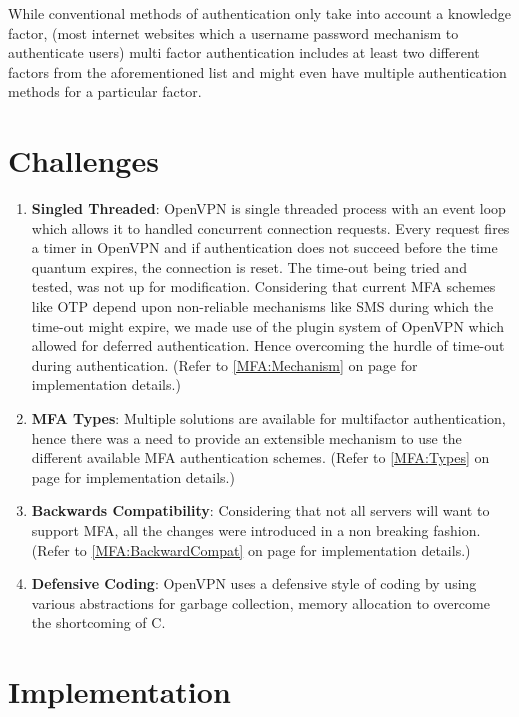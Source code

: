 \documentclass[11pt,oneside]{book}
\begin{document}
While conventional methods of authentication only take into account a knowledge factor,
(most internet websites which a username password mechanism to authenticate users)
multi factor authentication includes at least two different factors from the aforementioned
list and might even have multiple authentication methods for a particular factor.

\section{Challenges}
\begin{enumerate}
    \item \textbf{Singled Threaded}: OpenVPN is single threaded process with an event loop which
        allows it to handled concurrent connection requests. Every request fires a timer in OpenVPN
        and if authentication does not succeed before the time quantum expires, the connection is
        reset. The time-out being tried and tested, was not up for modification.
        Considering that current MFA schemes like OTP depend upon non-reliable mechanisms like
        SMS during which the time-out might expire, we made use of the plugin system of OpenVPN
        which allowed for deferred authentication. Hence overcoming the hurdle of time-out
        during authentication.
        (Refer to \ref{MFA:Mechanism} on page \pageref{MFA:Mechanism} for implementation details.)
    \item \textbf{MFA Types}: Multiple solutions are available for multifactor authentication, hence
        there was a need to provide an extensible mechanism to use the different available MFA
        authentication schemes. (Refer to \ref{MFA:Types} on page \pageref{MFA:Types} for
        implementation details.)
    \item \textbf{Backwards Compatibility}: Considering that not all servers will want to support
        MFA, all the changes were introduced in a non breaking fashion.
        (Refer to \ref{MFA:BackwardCompat} on page \pageref{MFA:BackwardCompat} for implementation details.)
    \item \textbf{Defensive Coding}: OpenVPN uses a defensive style of coding by using various
        abstractions for garbage collection, memory allocation to overcome the shortcoming of C.
\end{enumerate}

\section{Implementation}
\end{document}
